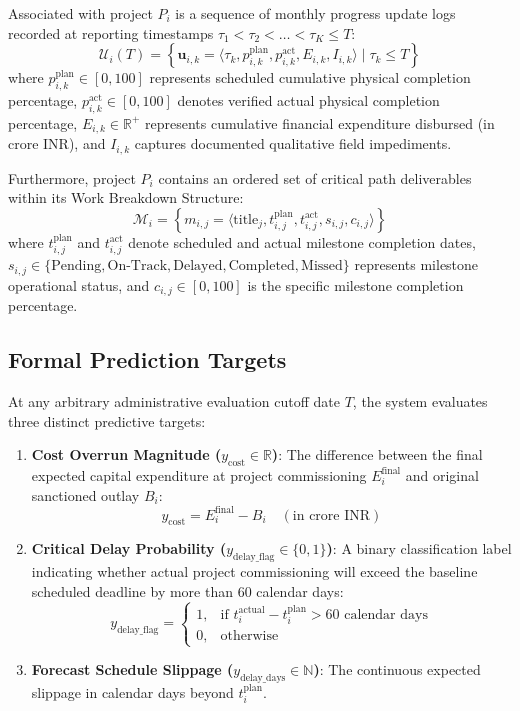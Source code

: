 \documentclass[conference]{IEEEtran}
\begin{document}
Associated with project $P_i$ is a sequence of monthly progress update logs recorded at reporting timestamps $\tau_1 < \tau_2 < \dots < \tau_K \le T$:
\begin{equation}
\mathcal{U}_i(T) = \left\{ \mathbf{u}_{i,k} = \langle \tau_k, p_{i,k}^{\text{plan}}, p_{i,k}^{\text{act}}, E_{i,k}, I_{i,k} \rangle \mid \tau_k \le T \right\}
\end{equation}
where $p_{i,k}^{\text{plan}} \in [0, 100]$ represents scheduled cumulative physical completion percentage, $p_{i,k}^{\text{act}} \in [0, 100]$ denotes verified actual physical completion percentage, $E_{i,k} \in \mathbb{R}^+$ represents cumulative financial expenditure disbursed (in crore INR), and $I_{i,k}$ captures documented qualitative field impediments.

Furthermore, project $P_i$ contains an ordered set of critical path deliverables within its Work Breakdown Structure:
\begin{equation}
\mathcal{M}_i = \left\{ m_{i,j} = \langle \text{title}_j, t_{i,j}^{\text{plan}}, t_{i,j}^{\text{act}}, s_{i,j}, c_{i,j} \rangle \right\}
\end{equation}
where $t_{i,j}^{\text{plan}}$ and $t_{i,j}^{\text{act}}$ denote scheduled and actual milestone completion dates, $s_{i,j} \in \{\text{Pending}, \text{On-Track}, \text{Delayed}, \text{Completed}, \text{Missed}\}$ represents milestone operational status, and $c_{i,j} \in [0, 100]$ is the specific milestone completion percentage.

\subsection{Formal Prediction Targets}
At any arbitrary administrative evaluation cutoff date $T$, the system evaluates three distinct predictive targets:
\begin{enumerate}
    \item \textbf{Cost Overrun Magnitude ($y_{\text{cost}} \in \mathbb{R}$)}: The difference between the final expected capital expenditure at project commissioning $E_i^{\text{final}}$ and original sanctioned outlay $B_i$:
    \begin{equation}
    y_{\text{cost}} = E_i^{\text{final}} - B_i \quad (\text{in crore INR})
    \end{equation}
    \item \textbf{Critical Delay Probability ($y_{\text{delay\_flag}} \in \{0, 1\}$)}: A binary classification label indicating whether actual project commissioning will exceed the baseline scheduled deadline by more than 60 calendar days:
    \begin{equation}
    y_{\text{delay\_flag}} = \begin{cases} 
    1, & \text{if } t_i^{\text{actual}} - t_i^{\text{plan}} > 60 \text{ calendar days} \\ 
    0, & \text{otherwise} 
    \end{cases}
    \end{equation}
    \item \textbf{Forecast Schedule Slippage ($y_{\text{delay\_days}} \in \mathbb{N}$)}: The continuous expected slippage in calendar days beyond $t_i^{\text{plan}}$.
\end{enumerate}
\end{document}
